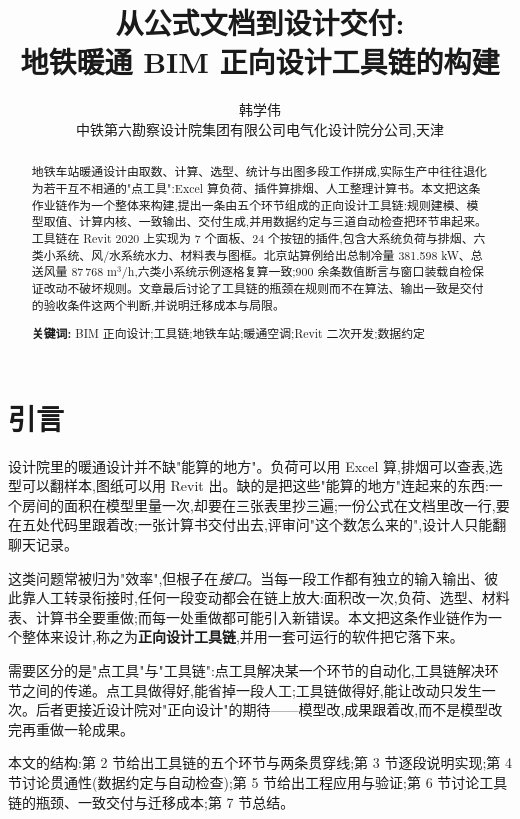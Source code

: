 \documentclass[UTF8,a4paper,zihao=-4]{ctexart}
\title{\heiti 从公式文档到设计交付:\\地铁暖通 BIM 正向设计工具链的构建}
\author{韩学伟\\[2pt] \small 中铁第六勘察设计院集团有限公司电气化设计院分公司,天津}
\date{}
\begin{document}
\maketitle

\begin{abstract}
\noindent
地铁车站暖通设计由取数、计算、选型、统计与出图多段工作拼成,实际生产中往往退化为若干互不相通的"点工具":Excel 算负荷、插件算排烟、人工整理计算书。本文把这条作业链作为一个整体来构建,提出一条由五个环节组成的正向设计工具链:规则建模、模型取值、计算内核、一致输出、交付生成,并用数据约定与三道自动检查把环节串起来。工具链在 Revit 2020 上实现为 7 个面板、24 个按钮的插件,包含大系统负荷与排烟、六类小系统、风/水系统水力、材料表与图框。北京站算例给出总制冷量 381.598 kW、总送风量 87\,768 m$^3$/h,六类小系统示例逐格复算一致;900 余条数值断言与窗口装载自检保证改动不破坏规则。文章最后讨论了工具链的瓶颈在规则而不在算法、输出一致是交付的验收条件这两个判断,并说明迁移成本与局限。
\vspace{0.5em}

\noindent\textbf{关键词:} BIM 正向设计;工具链;地铁车站;暖通空调;Revit 二次开发;数据约定
\end{abstract}

\section{引言}

设计院里的暖通设计并不缺"能算的地方"。负荷可以用 Excel 算,排烟可以查表,选型可以翻样本,图纸可以用 Revit 出。缺的是把这些"能算的地方"连起来的东西:一个房间的面积在模型里量一次,却要在三张表里抄三遍;一份公式在文档里改一行,要在五处代码里跟着改;一张计算书交付出去,评审问"这个数怎么来的",设计人只能翻聊天记录。

这类问题常被归为"效率",但根子在\emph{接口}。当每一段工作都有独立的输入输出、彼此靠人工转录衔接时,任何一段变动都会在链上放大:面积改一次,负荷、选型、材料表、计算书全要重做;而每一处重做都可能引入新错误。本文把这条作业链作为一个整体来设计,称之为\textbf{正向设计工具链},并用一套可运行的软件把它落下来。

需要区分的是"点工具"与"工具链":点工具解决某一个环节的自动化,工具链解决环节之间的传递。点工具做得好,能省掉一段人工;工具链做得好,能让改动只发生一次。后者更接近设计院对"正向设计"的期待——模型改,成果跟着改,而不是模型改完再重做一轮成果。

本文的结构:第 2 节给出工具链的五个环节与两条贯穿线;第 3 节逐段说明实现;第 4 节讨论贯通性(数据约定与自动检查);第 5 节给出工程应用与验证;第 6 节讨论工具链的瓶颈、一致交付与迁移成本;第 7 节总结。
\end{document}
